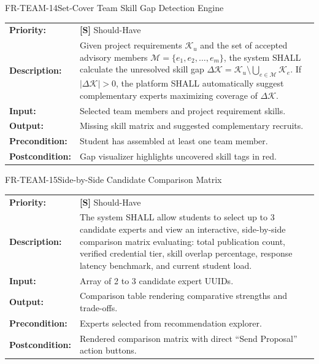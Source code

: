 \documentclass[11pt,a4paper]{article}
\begin{document}
\begin{reqbox}{FR-TEAM-14}{Set-Cover Team Skill Gap Detection Engine}
\begin{tabularx}{\textwidth}{@{}lX@{}}
\textbf{Priority:} & \textbf{[S]} Should-Have \\
\textbf{Description:} & Given project requirements $\mathcal{K}_u$ and the set of accepted advisory members $\mathcal{M} = \{e_1, e_2, \dots, e_m\}$, the system SHALL calculate the unresolved skill gap $\Delta \mathcal{K} = \mathcal{K}_u \setminus \bigcup_{e \in \mathcal{M}} \mathcal{K}_e$. If $|\Delta \mathcal{K}| > 0$, the platform SHALL automatically suggest complementary experts maximizing coverage of $\Delta \mathcal{K}$. \\
\textbf{Input:} & Selected team members and project requirement skills. \\
\textbf{Output:} & Missing skill matrix and suggested complementary recruits. \\
\textbf{Precondition:} & Student has assembled at least one team member. \\
\textbf{Postcondition:} & Gap visualizer highlights uncovered skill tags in red. \\
\end{tabularx}
\end{reqbox}

\begin{reqbox}{FR-TEAM-15}{Side-by-Side Candidate Comparison Matrix}
\begin{tabularx}{\textwidth}{@{}lX@{}}
\textbf{Priority:} & \textbf{[S]} Should-Have \\
\textbf{Description:} & The system SHALL allow students to select up to 3 candidate experts and view an interactive, side-by-side comparison matrix evaluating: total publication count, verified credential tier, skill overlap percentage, response latency benchmark, and current student load. \\
\textbf{Input:} & Array of 2 to 3 candidate expert UUIDs. \\
\textbf{Output:} & Comparison table rendering comparative strengths and trade-offs. \\
\textbf{Precondition:} & Experts selected from recommendation explorer. \\
\textbf{Postcondition:} & Rendered comparison matrix with direct ``Send Proposal'' action buttons. \\
\end{tabularx}
\end{reqbox}
\end{document}

